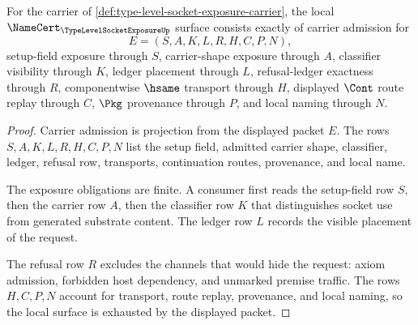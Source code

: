 \begin{theorem}
\label{thm:type-level-socket-exposure-namecert-obligations}
For the carrier of \autoref{def:type-level-socket-exposure-carrier}, the local $\NameCert_{\TypeLevelSocketExposureUp}$ surface consists exactly of carrier admission for
$$
E=(S,A,K,L,R,H,C,P,N),
$$
setup-field exposure through $S$, carrier-shape exposure through $A$, classifier visibility through $K$, ledger placement through $L$, refusal-ledger exactness through $R$, componentwise $\hsame$ transport through $H$, displayed $\Cont$ route replay through $C$, $\Pkg$ provenance through $P$, and local naming through $N$.
\end{theorem}
\begin{proof}
Carrier admission is projection from the displayed packet $E$. The rows $S,A,K,L,R,H,C,P,N$ list the setup field, admitted carrier shape, classifier, ledger, refusal row, transports, continuation routes, provenance, and local name.

The exposure obligations are finite. A consumer first reads the setup-field row $S$, then the carrier row $A$, then the classifier row $K$ that distinguishes socket use from generated substrate content. The ledger row $L$ records the visible placement of the request.

The refusal row $R$ excludes the channels that would hide the request: axiom admission, forbidden host dependency, and unmarked premise traffic. The rows $H,C,P,N$ account for transport, route replay, provenance, and local naming, so the local surface is exhausted by the displayed packet.
\end{proof}

